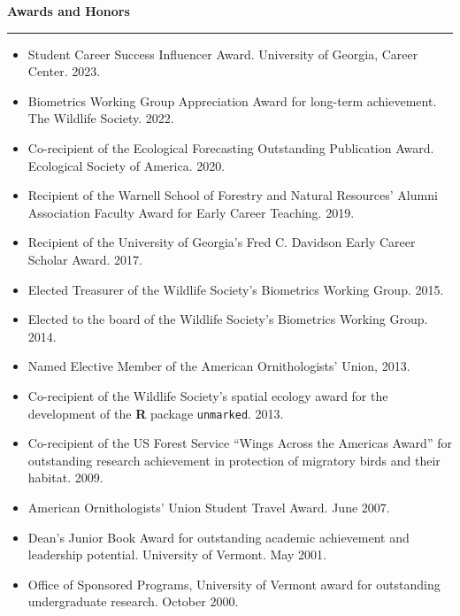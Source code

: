 \documentclass[12pt]{article}
\begin{document}
\vspace{0.5cm}



{\large \bf Awards and Honors} \\
\rule[3mm]{\textwidth}{0.3mm}

\begin{itemize}

\item Student Career Success Influencer Award. University of
  Georgia, Career Center. 2023.

\item Biometrics Working Group Appreciation Award for long-term
  achievement. The Wildlife Society. 2022.
  
\item Co-recipient of the Ecological Forecasting Outstanding
  Publication Award. Ecological Society of America. 2020. 
  
\item Recipient of the Warnell School of Forestry and Natural
  Resources' Alumni Association Faculty Award for Early Career
  Teaching. 2019. 
  
\item Recipient of the University of Georgia's Fred C. Davidson Early
  Career Scholar Award. 2017. 

\item Elected Treasurer of the Wildlife Society's Biometrics Working
  Group. 2015. 

\item Elected to the board of the Wildlife Society's Biometrics
  Working Group. 2014. 

\item Named Elective Member of the American Ornithologists' Union,
  2013. 

\item Co-recipient of the Wildlife Society's spatial ecology award for
  the development of the {\bf R} package {\tt unmarked}. 2013.

\item Co-recipient of the US Forest Service ``Wings Across the
  Americas Award'' for outstanding research achievement in protection
  of migratory birds and their habitat. 2009.

\item American Ornithologists' Union Student Travel Award. June 2007.

\item Dean's Junior Book Award for outstanding academic achievement
  and leadership potential. University of Vermont. May 2001.

\item Office of Sponsored Programs, University of Vermont award for
  outstanding undergraduate research. October 2000.

\end{itemize}
\end{document}
